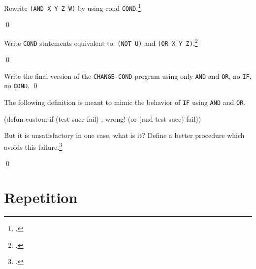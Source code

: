 \documentclass[a4paper,11pt]{article}
\begin{document}
\begin{uexercise}

Rewrite \Verb+(AND X Y Z W)+ by using cond \Verb+COND+.\footnote{.}

\qed
\end{uexercise}

\begin{uexercise}
Write \Verb+COND+ statements equivalent to: \Verb+(NOT U)+ and \Verb+(OR X Y Z)+.\footnote{.}

\qed
\end{uexercise}

\begin{uexercise}
Write the final version of the \Verb+CHANGE-COND+ program using only \Verb+AND+ and \Verb+OR+, no \Verb+IF+, no \Verb+COND+. 
\qed
\end{uexercise}

\begin{uexercise}
The following definition is meant to mimic the behavior of \Verb+IF+ using \Verb+AND+ and \Verb+OR+.

\begin{lispcode}
(defun custom-if (test succ fail) ; wrong!
  (or (and test succ) fail))
\end{lispcode}

But it is unsatisfactory in one case, what is it? 
Define a better procedure which avoids this failure.\footnote{.}

\qed
\end{uexercise}

\noindent\hrulefill

\newpage

\section{Repetition}
\end{document}
